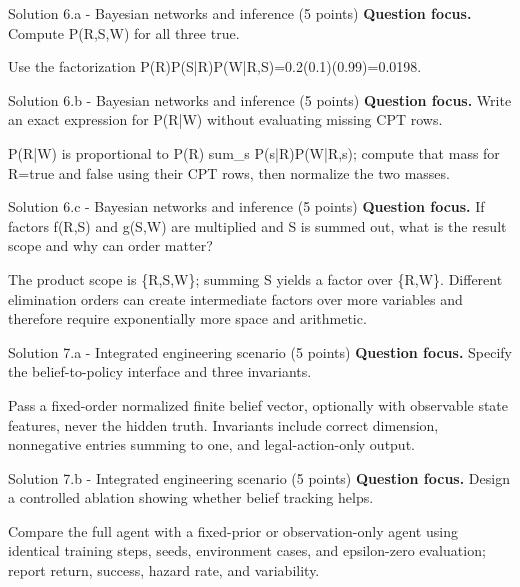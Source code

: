 \documentclass[aspectratio=169,11pt]{beamer}
\begin{document}
\begin{frame}{Solution 6.a - Bayesian networks and inference (5 points)}
\small
\textbf{Question focus.} Compute P(R,S,W) for all three true.

\vspace{0.25cm}
\answerlabel Use the factorization P(R)P(S|R)P(W|R,S)=0.2(0.1)(0.99)=0.0198.
\end{frame}

\begin{frame}{Solution 6.b - Bayesian networks and inference (5 points)}
\small
\textbf{Question focus.} Write an exact expression for P(R|W) without evaluating missing CPT rows.

\vspace{0.25cm}
\answerlabel P(R|W) is proportional to P(R) sum\_s P(s|R)P(W|R,s); compute that mass for R=true and false using their CPT rows, then normalize the two masses.
\end{frame}

\begin{frame}{Solution 6.c - Bayesian networks and inference (5 points)}
\small
\textbf{Question focus.} If factors f(R,S) and g(S,W) are multiplied and S is summed out, what is the result scope and why can order matter?

\vspace{0.25cm}
\answerlabel The product scope is \{R,S,W\}; summing S yields a factor over \{R,W\}. Different elimination orders can create intermediate factors over more variables and therefore require exponentially more space and arithmetic.
\end{frame}

\begin{frame}{Solution 7.a - Integrated engineering scenario (5 points)}
\small
\textbf{Question focus.} Specify the belief-to-policy interface and three invariants.

\vspace{0.25cm}
\answerlabel Pass a fixed-order normalized finite belief vector, optionally with observable state features, never the hidden truth. Invariants include correct dimension, nonnegative entries summing to one, and legal-action-only output.
\end{frame}

\begin{frame}{Solution 7.b - Integrated engineering scenario (5 points)}
\small
\textbf{Question focus.} Design a controlled ablation showing whether belief tracking helps.

\vspace{0.25cm}
\answerlabel Compare the full agent with a fixed-prior or observation-only agent using identical training steps, seeds, environment cases, and epsilon-zero evaluation; report return, success, hazard rate, and variability.
\end{frame}
\end{document}
